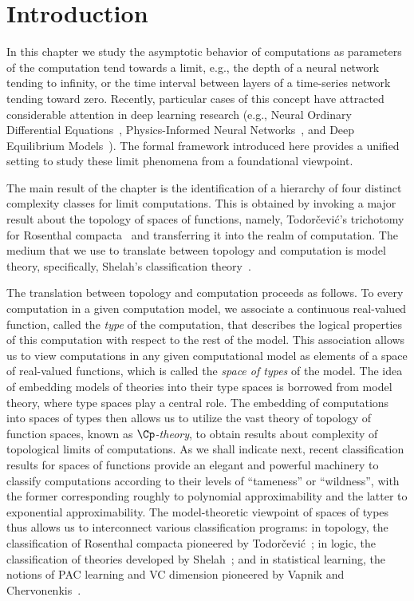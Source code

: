 
\section{Introduction}\label{sec:deep_comp_intro}

In this chapter we study the asymptotic behavior of computations as parameters of the computation tend towards a limit, e.g., the depth of a neural network tending to infinity, or the time interval between layers of a time-series network tending toward zero.
Recently, particular cases of this concept have attracted considerable attention in deep learning research (e.g., Neural Ordinary Differential Equations~\cite{Chen:2018}, Physics-Informed Neural Networks~\cite{Raissi-Perdikaris-Karniadakis:2019}, and Deep Equilibrium Models~\cite{Bai:2019}).
The formal framework introduced here provides a unified setting to study these limit phenomena from a foundational viewpoint.

The main result of the chapter is the identification of a hierarchy of four distinct complexity classes for limit computations.
This is obtained by invoking a major result about the topology of spaces of functions, namely,
Todorčević's trichotomy for Rosenthal compacta~\cite{Todorcevic_1999_CompactSubsetsBaire} and transferring it into the realm of computation.
The medium that we use to translate between topology and computation is model theory, specifically, Shelah's classification theory~\cite{Shelah:1990}.

The translation between topology and computation proceeds as follows.
To every computation in a given computation model, we associate a continuous real-valued function, called the \emph{type} of the computation, that describes the logical properties of this computation with respect to the rest of the model.
This association allows us to view computations in any given computational model as elements of a space of real-valued functions, which is called the \emph{space of types} of the model.
The idea of embedding models of theories into their type spaces is borrowed from model theory, where type spaces play a central role.
The embedding of computations into spaces of types then allows us to utilize the vast theory of topology of function spaces, known as \emph{$\Cp$-theory}, to obtain results about complexity of topological limits of computations.
As we shall indicate next, recent classification results for spaces of functions provide an elegant and powerful machinery to classify computations according to their levels of ``tameness'' or ``wildness'', with the former corresponding roughly to polynomial approximability and the latter to exponential approximability.
The model-theoretic viewpoint of spaces of types thus allows us to interconnect various classification programs: 
in topology, the classification of Rosenthal compacta pioneered by Todorčević~\cite{Todorcevic_1999_CompactSubsetsBaire}; 
in logic, the classification of theories developed by Shelah~\cite{Shelah:1990}; and in statistical learning, the notions of PAC learning and VC dimension pioneered by Vapnik and Chervonenkis~\cite{Vapnik-Chervonenkis:1974, Vapnik-Chervonenkis:1971}.

